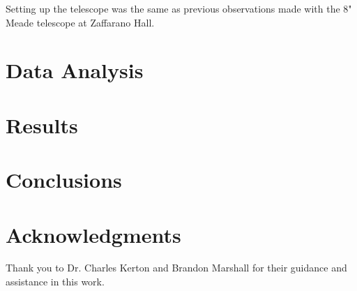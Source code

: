 \documentclass[%
aip,
jmp,
reprint,
floatfix
]{revtex4-1}
\begin{document}
	Setting up the telescope was the same as previous observations made with the 8" Meade telescope at Zaffarano Hall.


	\section{Data Analysis}
	


	\section{Results}

	


	\section{Conclusions}
	
	


	\section*{Acknowledgments}

	Thank you to Dr. Charles Kerton and Brandon Marshall for their guidance and assistance in this work.
\end{document}
